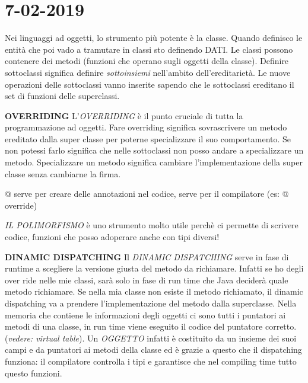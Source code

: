 

\newpage
\section{7-02-2019}
Nei linguaggi ad oggetti, lo strumento più potente è la classe. Quando definisco le entità che poi vado a tramutare in classi sto definendo DATI. \newline
Le classi possono contenere dei metodi (funzioni che operano sugli oggetti della classe). \newline
Definire sottoclassi significa definire \textit{sottoinsiemi} nell'ambito dell'ereditarietà. Le nuove operazioni delle sottoclassi vanno inserite sapendo che le sottoclassi ereditano il set di funzioni delle superclassi. 

\noindent \textbf{OVERRIDING} \newline
L'\textit{OVERRIDING} è il punto cruciale di tutta la programmazione ad oggetti. Fare overriding significa sovrascrivere un metodo ereditato dalla super classe per poterne specializzare il suo comportamento. Se non potessi farlo significa che nelle sottoclassi non posso andare a specializzare un metodo. Specializzare un metodo significa cambiare l'implementazione della super classe senza cambiarne la firma. 

\noindent @ serve per creare delle annotazioni nel codice, serve per il compilatore (es: @ override)

\noindent \textit{IL POLIMORFISMO} è uno strumento molto utile perchè ci permette di scrivere codice, funzioni che posso adoperare anche con tipi diversi!

\noindent \textbf{DINAMIC DISPATCHING} \newline
Il \textit{DINAMIC DISPATCHING} serve in fase di runtime a scegliere la versione giusta del metodo da richiamare. Infatti se ho degli over ride nelle mie classi, sarà solo in fase di run time che Java deciderà quale metodo richiamare. Se nella mia classe non esiste il metodo richiamato, il dinamic dispatching va a prendere l'implementazione del metodo dalla superclasse. Nella memoria che contiene le informazioni degli oggetti ci sono tutti i puntatori ai metodi di una classe, in run time viene eseguito il codice del puntatore corretto. (\textit{vedere: virtual table}).
Un \textit{OGGETTO} infatti è costituito da un insieme dei suoi campi e da puntatori ai metodi della classe ed è grazie a questo che il dispatching funziona: il compilatore controlla i tipi e garantisce che nel compiling time tutto questo funzioni. 

